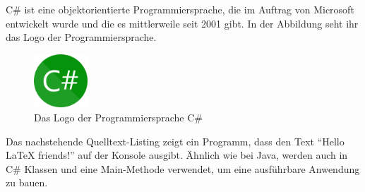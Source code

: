 C\# ist eine objektorientierte Programmiersprache, die im Auftrag von Microsoft entwickelt wurde und die es mittlerweile seit 2001 gibt. In der Abbildung seht ihr das Logo der Programmiersprache. 

\begin{figure}[H]
	\caption{Das Logo der Programmiersprache C\#}
	\centering
	\includegraphics[width=2cm]{exercises/references/csharp.png}
\end{figure}

Das nachstehende Quelltext-Listing zeigt ein Programm, dass den Text \enquote{Hello LaTeX friends!} auf der Konsole ausgibt. Ähnlich wie bei Java, werden auch in C\# Klassen und eine Main-Methode verwendet, um eine ausführbare Anwendung zu bauen. 

\inputminted[breaklines, linenos=true]{csharp}{exercises/references/HelloWorld.cs}




